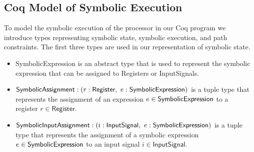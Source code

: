 






\subsection{Coq Model of Symbolic Execution}
To model the symbolic execution of the processor in our Coq program we introduce
types representing symbolic state, symbolic
execution, and path constraints. The first three types are used in our
representation of symbolic state. 
\begin{itemize}
  \item \textsf{SymbolicExpression} is an abstract type that is used to
    represent the symbolic expression that can be assigned to \textsf{Register}s
    or \textsf{InputSignal}s.
  \item $\textsf{SymbolicAssignment} : (r: \textsf{Register},~
    e: \textsf{SymbolicExpression})$ is a tuple type that
    represents the assignment of an expression $e \in
    \textsf{SymbolicExpression}$ to a register $r \in \textsf{Register}$.
  \item $\textsf{SymbolicInputAssignment} : (i: \textsf{InputSignal},~
    e: \textsf{SymbolicExpression})$ is a tuple type that
    represents the assignment of a symbolic expression $e \in
    \textsf{SymbolicExpression}$ to an input signal $i \in \textsf{InputSignal}$.
\end{itemize}

